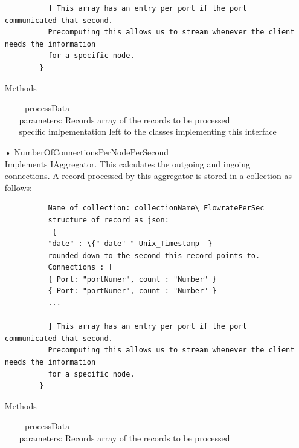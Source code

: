 \documentclass[oneside, english, final]{design}
\begin{document}
\begin{itemize}
\begin{verbatim}
		  ] This array has an entry per port if the port communicated that second. 
		  Precomputing this allows us to stream whenever the client needs the information 
		  for a specific node.
		}
	      \end{verbatim}
	      Methods
	      \begin{itemize}
		      \item[-]processData
		      \\parameters: Records array of the records to be processed
		      \\ specific imlpementation left to the classes implementing this interface
	      \end{itemize}

   \item[•] NumberOfConnectionsPerNodePerSecond
		  \\Implements IAggregator. This calculates the outgoing and ingoing connections.
		  A record processed by this aggregator is stored in a collection as follows:
	      \begin{verbatim} 
		  Name of collection: collectionName\_FlowratePerSec
		  structure of record as json:
		   {
		  "date" : \{" date" " Unix_Timestamp  } 
		  rounded down to the second this record points to.
		  Connections : [
		  { Port: "portNumer", count : "Number" }
		  { Port: "portNumer", count : "Number" }
		  ...
		  
		  ] This array has an entry per port if the port communicated that second. 
		  Precomputing this allows us to stream whenever the client needs the information 
		  for a specific node.
		}
	      \end{verbatim}
	      Methods
	      \begin{itemize}
		      \item[-]processData
		      \\parameters: Records array of the records to be processed
	      \end{itemize}


\end{itemize}
\end{document}
